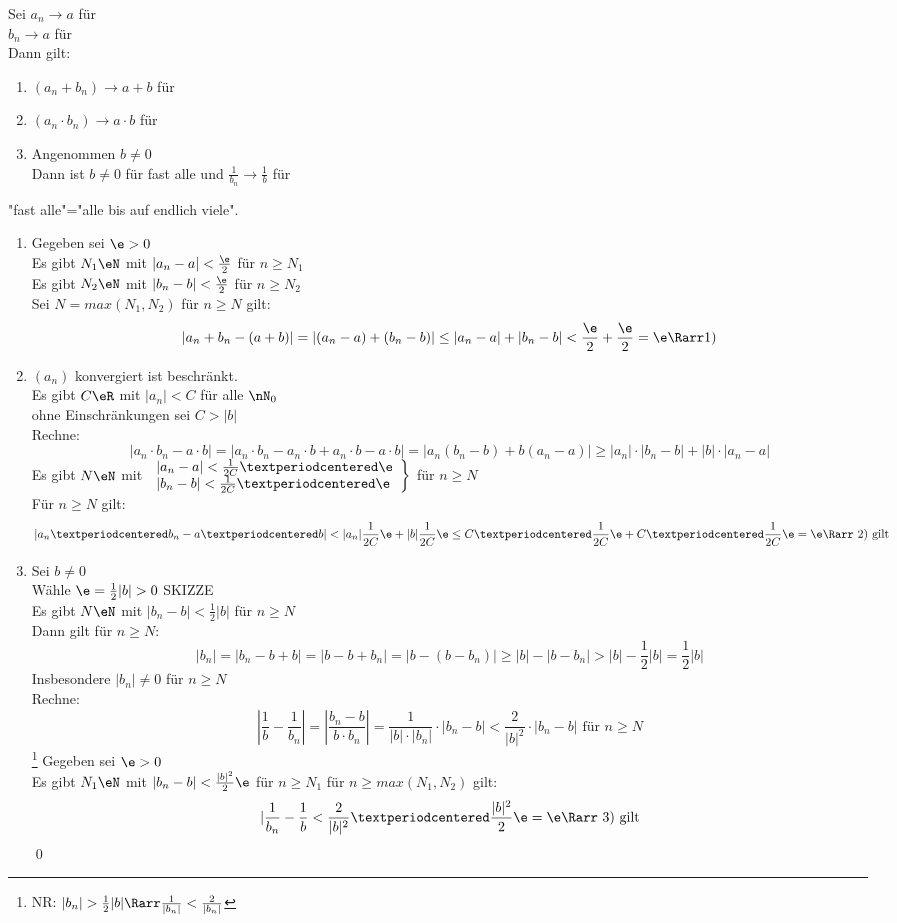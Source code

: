 Sei $a_n→a$ für \nif\\
\phantom{Sei }$b_n→a$ für \nif\\ %
Dann gilt:
\begin{enumerate}
\item{$(a_n+b_n)→a+b$ für \nif}
\item{$(a_n·b_n)→a·b$ für \nif}
\item{Angenommen $b\neq 0$\\
Dann ist $b\neq 0$ für fast alle \nN{} und $\frac{1}{b_n}→\frac{1}{b}$ für \nif}
\end{enumerate}
%
"fast alle"="alle bis auf endlich viele".
%
\bew
\begin{enumerate}
\item{Gegeben sei $\e>0$\\
Es gibt $N_1\eN$ mit $|a_n-a|<\frac{\e}{2}$ für $n\geq N_1$\\
Es gibt $N_2\eN$ mit $|b_n-b|<\frac{\e}{2}$ für $n\geq N_2$\\
Sei $N=max(N_1,N_2)$ für $n\geq N$ gilt:\\
$$|a_n+b_n-(a+b)|=|(a_n-a)+(b_n-b)|\leq |a_n-a|+|b_n-b|<\frac{\e}{2}+\frac{\e}{2}=\e \Rarr \text{1)}$$}
\item{$(a_n)$ konvergiert \Rarr{} ist beschränkt.\\
Es gibt $C\eR$ mit $|a_n|<C$ für alle $\nN_0$\\
ohne Einschränkungen sei $C>|b|$\\
Rechne:
$$|a_n·b_n-a·b|=|a_n·b_n-a_n·b+a_n·b-a·b|=|a_n(b_n-b)+b(a_n-a)|\geq |a_n|·|b_n-b|+|b|·|a_n-a|$$
Es gibt $N\eN$ mit $\left.\begin{array}{l}|a_n-a|<\frac{1}{2C}·\e\\|b_n-b|<\frac{1}{2C}·\e\end{array} \right\}$ für $n\geq N$\\
Für $n\geq N$ gilt:
$$|a_n·b_n-a·b|<|a_n|\frac{1}{2C}\e+|b|\frac{1}{2C}\e\leq C·\frac{1}{2C}\e+C·\frac{1}{2C}\e=\e \Rarr \text{ 2) gilt}$$}
\item{Sei $b\neq 0$\\
Wähle $\e=\frac{1}{2}|b|>0$ SKIZZE\\
Es gibt $N\eN$ mit $|b_n-b|<\frac{1}{2}|b|$ für $n\geq N$\\
Dann gilt für $n\geq N$:
$$|b_n|=|b_n-b+b|=|b-b+b_n|=|b-(b-b_n)|\geq |b|-|b-b_n|>|b|-\frac{1}{2}|b|=\frac{1}{2}|b|$$
Insbesondere $|b_n|\neq 0$ für $n\geq N$\\
Rechne:
$$\left|\frac{1}{b}-\frac{1}{b_n}\right|=\left|\frac{b_n-b}{b·b_n}\right|=\frac{1}{|b|·|b_n|}·|b_n-b|<\frac{2}{|b|^2}·|b_n-b| \text{ für $n\geq N$}$$\footnote{NR: $|b_n|>\frac{1}{2}|b| \Rarr \frac{1}{|b_n|}<\frac{2}{|b_n|}$}
Gegeben sei $\e>0$\\
Es gibt $N_1\eN$ mit $|b_n-b|<\frac{|b|^2}{2}\e$ für $n\geq N_1$\Rarr{} für $n\geq max(N_1,N_2)$ gilt:\\
$$|\frac{1}{b_n}-\frac{1}{b}<\frac{2}{|b|^2}·\frac{|b|^2}{2}\e=\e \Rarr \text{ 3) gilt}$$\qed}
\end{enumerate}
